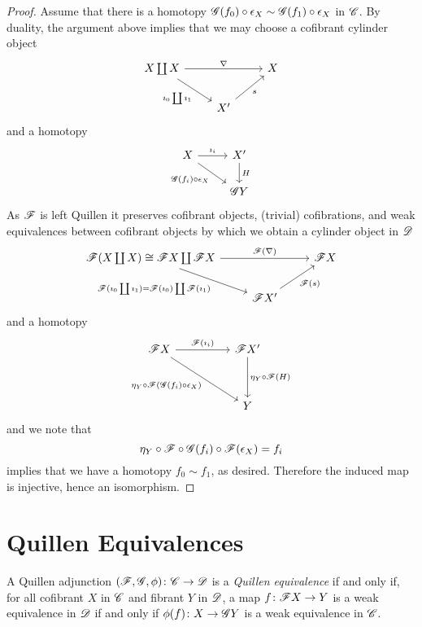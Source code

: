 \documentclass[10pt]{amsart}
\begin{document}
\begin{lem}
\begin{proof}
    Assume that there is a homotopy $\mathscr{G}(f_0) \circ \epsilon_X \sim \mathscr{G}(f_1) \circ \epsilon_X$ in $\mathscr{C}$.
    By duality, the argument above implies that we may choose a cofibrant cylinder object
    $$\begin{tikzcd}
      X \coprod X \arrow{rr}{\nabla}\arrow[swap]{rd}{\imath_0 \coprod \imath_1} && X\\
      & X^\prime \arrow[swap]{ur}{s}
    \end{tikzcd}$$
    and a homotopy
    $$\begin{tikzcd}
      X \arrow{r}{\imath_i}\arrow[swap]{rd}{\G(f_i) \circ \epsilon_X} & X^\prime \arrow{d}{H}\\
      & \G Y
    \end{tikzcd}$$
    As $\mathscr{F}$ is left Quillen it preserves cofibrant objects, (trivial) cofibrations, and weak equivalences between cofibrant objects by which we obtain a cylinder object in $\mathscr{D}$
    $$\begin{tikzcd}
      \F (X \coprod X) \cong \F X \coprod \F X \arrow[swap]{rd}{\F(\imath_0 \coprod \imath_1) = \F(\imath_0) \coprod \F(\imath_1)}\arrow{rr}{\F(\nabla)} && \F X\\
      & \F X^\prime \arrow[swap]{ur}{\F(s)}
    \end{tikzcd}$$
    and a homotopy
    $$\begin{tikzcd}
      \F X \arrow[swap]{rrdd}{\eta_Y \circ \F (\G(f_i) \circ \epsilon_X)} \arrow{rr}{\F(\imath_i)} & & \F X^\prime \arrow{dd}{\eta_Y \circ \F(H)}\\
      \\
      & & Y
    \end{tikzcd}$$
    and we note that 
    $$\eta_Y \circ \mathscr{F} \circ \mathscr{G}(f_i) \circ \mathscr{F}(\epsilon_X) = f_i$$
    implies that we have a homotopy $f_0 \sim f_1$, as desired.
    Therefore the induced map is injective, hence an isomorphism.
  \end{proof}
\end{lem}

\section{Quillen Equivalences}
\begin{defn}
  A Quillen adjunction $(\mathscr{F}, \mathscr{G}, \phi) \colon \mathscr{C} \to \mathscr{D}$ is a {\it Quillen equivalence} if and only if, for all cofibrant $X$ in $\mathscr{C}$ and fibrant $Y$ in $\mathscr{D}$, a map $f \colon \mathscr{F} X \to Y$ is a weak equivalence in $\mathscr{D}$ if and only if $\phi(f) \colon X \to \mathscr{G} Y$ is a weak equivalence in $\mathscr{C}$.
\end{defn}
\end{document}
